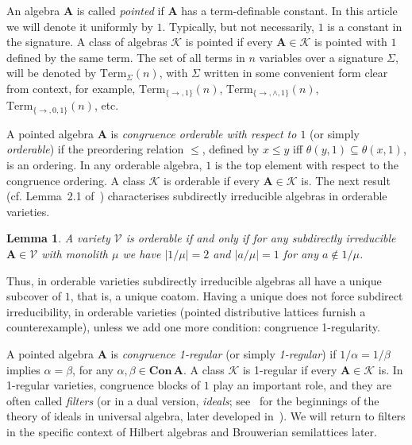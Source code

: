\documentclass{amsart}
\newtheorem{lemma}[theorem]{Lemma}
\newcommand{\alg}[1]{\mathbf{#1}}
\newcommand{\Con}[1]{\mathbf{Con}\, #1}
\def\ra{\rightarrow}
\begin{document}
An algebra $\alg{A}$ is called \emph{pointed} if $\alg{A}$ has a term-definable
constant. In this article we will denote it uniformly by $1$.
Typically, but not necessarily,
$1$ is a constant in the signature. A class of algebras
$\mathcal{K}$ is pointed if every $\alg{A}\in\mathcal{K}$ is pointed
with $1$ defined by the same term. The set of all terms in
$n$ variables over a signature $\Sigma$, will be denoted by
$\mathrm{Term}_\Sigma(n)$, with $\Sigma$ 
written in some convenient form clear from context, for example,
$\mathrm{Term}_{\{\ra,1\}}(n)$, $\mathrm{Term}_{\{\ra,\wedge,1\}}(n)$,
$\mathrm{Term}_{\{\ra,0,1\}}(n)$, etc. 


A pointed algebra $\alg{A}$ is
\emph{congruence orderable with respect to $1$} (or simply
\emph{orderable}) if the preordering relation $\leq$, defined
by $x\leq y$ if{f} $\theta(y,1)\subseteq\theta(x,1)$, is an ordering.
In any orderable algebra, $1$ is the top element with respect to the congruence
ordering. A class 
$\mathcal{K}$ is orderable if every $\alg{A}\in\mathcal{K}$ is.
The next result (cf. Lemma~2.1  of~\cite{ISW09}) characterises
subdirectly irreducible algebras in orderable varieties.

\begin{lemma}\label{lem:1-orderable-si}
A variety $\mathcal{V}$ is orderable if and only if for any subdirectly
irreducible $\alg{A}\in\mathcal{V}$ with monolith $\mu$ we have
$|1/\mu| = 2$ and $|a/\mu| = 1$ for any $a\notin 1/\mu$.
\end{lemma}


Thus, in orderable varieties
subdirectly irreducible algebras all have a unique
subcover of $1$, that is, a unique coatom.
Having a unique does not 
force subdirect irreducibility, in orderable varieties (pointed
distributive lattices furnish a counterexample), unless we add one more
condition: congruence 1-regularity.

A pointed algebra $\alg{A}$ is  
\emph{congruence 1-regular} (or simply 
\emph{1-regular}) if $1/\alpha = 1/\beta$ implies $\alpha = \beta$,
for any $\alpha,\beta\in\Con{\alg{A}}$. A class $\mathcal{K}$ is 1-regular
if every $\alg{A}\in\mathcal{K}$ is. In 1-regular varieties, congruence
blocks of $1$ play an important role, 
and they are often called \emph{filters} (or in a dual version, \emph{ideals};
see~\cite{GU84} for the beginnings of the theory of ideals in universal algebra,
later developed in~\cite{Urs94, AU96, AU97, AU97a, Urs00}).
We will return to filters in the
specific context of Hilbert algebras and Brouwerian semilattices later.
\end{document}
